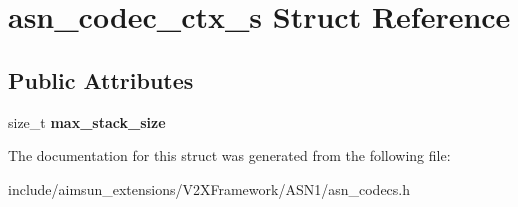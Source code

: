 \hypertarget{structasn__codec__ctx__s}{}\section{asn\+\_\+codec\+\_\+ctx\+\_\+s Struct Reference}
\label{structasn__codec__ctx__s}
\subsection*{Public Attributes}
\begin{DoxyCompactItemize}
\item 
size\+\_\+t {\bfseries max\+\_\+stack\+\_\+size}\hypertarget{structasn__codec__ctx__s_a2288d874de0b3366acd79fba3aa20a0c}{}\label{structasn__codec__ctx__s_a2288d874de0b3366acd79fba3aa20a0c}

\end{DoxyCompactItemize}


The documentation for this struct was generated from the following file\+:\begin{DoxyCompactItemize}
\item 
include/aimsun\+\_\+extensions/\+V2\+X\+Framework/\+A\+S\+N1/asn\+\_\+codecs.\+h\end{DoxyCompactItemize}

